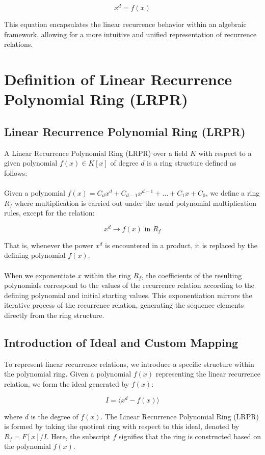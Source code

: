 \documentclass{article}
\theoremstyle{plain}
\begin{document}
\[ x^d = f(x) \]

This equation encapsulates the linear recurrence behavior within an algebraic framework, allowing for a more intuitive and unified representation of recurrence relations.

\section{Definition of Linear Recurrence Polynomial Ring (LRPR)}

\subsection{Linear Recurrence Polynomial Ring (LRPR)}
A Linear Recurrence Polynomial Ring (LRPR) over a field \( K \) with respect to a given polynomial \( f(x) \in K[x] \) of degree \( d \) is a ring structure defined as follows:
\\
\\
Given a polynomial \( f(x) = C_d x^d + C_{d-1} x^{d-1} + \ldots + C_1 x + C_0 \), we define a ring \( R_f \) where multiplication is carried out under the usual polynomial multiplication rules, except for the relation:

\[ x^d \rightarrow f(x) \text{ in } R_f \]

That is, whenever the power \( x^d \) is encountered in a product, it is replaced by the defining polynomial \( f(x) \).
\\
\\
When we exponentiate \( x \) within the ring \( R_f \), the coefficients of the resulting polynomials correspond to the values of the recurrence relation according to the defining polynomial and initial starting values. This exponentiation mirrors the iterative process of the recurrence relation, generating the sequence elements directly from the ring structure.

\subsection{Introduction of Ideal and Custom Mapping}

To represent linear recurrence relations, we introduce a specific structure within the polynomial ring. Given a polynomial \( f(x) \) representing the linear recurrence relation, we form the ideal generated by \( f(x) \):

\[
I = \langle x^d - f(x) \rangle
\]

where \( d \) is the degree of \( f(x) \). The Linear Recurrence Polynomial Ring (LRPR) is formed by taking the quotient ring with respect to this ideal, denoted by \( R_f = F[x] / I \). Here, the subscript \( f \) signifies that the ring is constructed based on the polynomial \( f(x) \).
\end{document}
